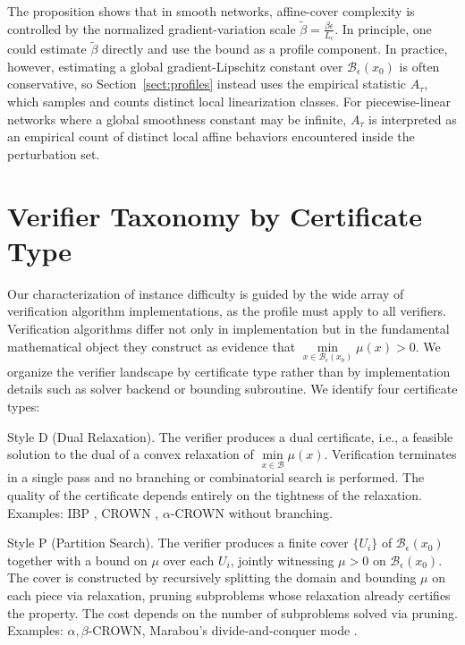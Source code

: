 \documentclass{article}
\theoremstyle{definition}
\begin{document}
The proposition shows that in smooth networks, affine-cover complexity is controlled by the normalized gradient-variation scale $\widetilde\beta=\frac{\beta\epsilon}{L_c}$. In principle, one could estimate $\widetilde\beta$ directly and use the bound as a profile component. In practice, however, estimating a global gradient-Lipschitz constant over $\mathcal{B}_\epsilon(x_0)$ is often conservative, so Section~\ref{sect:profiles} instead uses the empirical statistic $A_\tau$, which samples and counts distinct local linearization classes. For piecewise-linear networks where a global smoothness constant may be infinite, $A_\tau$ is interpreted as an empirical count of distinct local affine behaviors encountered inside the perturbation set.

\section{Verifier Taxonomy by Certificate Type}\label{app:taxonomy}

Our characterization of instance difficulty is guided by the wide array of verification algorithm implementations, as the profile must apply to all verifiers. Verification algorithms differ not only in implementation but in the fundamental mathematical object they construct as evidence that $\min\limits_{x \in \mathcal{B}_\epsilon(x_0)} \mu(x) > 0$. We organize the verifier landscape by certificate type rather than by implementation details such as solver backend or bounding subroutine. We identify four certificate types:

Style D (Dual Relaxation). The verifier produces a dual certificate, i.e., a feasible solution to the dual of a convex relaxation of $\min\limits_{x \in \mathcal{B}} \mu(x)$. Verification terminates in a single pass and no branching or combinatorial search is performed. The quality of the certificate depends entirely on the tightness of the relaxation. Examples: IBP \cite{DBLP:journals/corr/abs-1810-12715}, CROWN \cite{zhang2018efficientneuralnetworkrobustness}, $\alpha$-CROWN \cite{%
xu2020automatic, 
xu2021fastcompleteenablingcomplete} without branching.

Style P (Partition Search). The verifier produces a finite cover $\{U_i\}$ of $\mathcal{B}_\epsilon(x_0)$ together with a bound on $\mu$ over each $U_i$, jointly witnessing $\mu > 0$ on $\mathcal{B}_\epsilon(x_0)$. The cover is constructed by recursively splitting the domain and bounding $\mu$ on each piece via relaxation, pruning subproblems whose relaxation already certifies the property. The cost depends on the number of subproblems solved via pruning. Examples: $\alpha,\beta$-CROWN, Marabou's divide-and-conquer mode \cite{10.1007/978-3-030-25540-4_26}.
\end{document}
